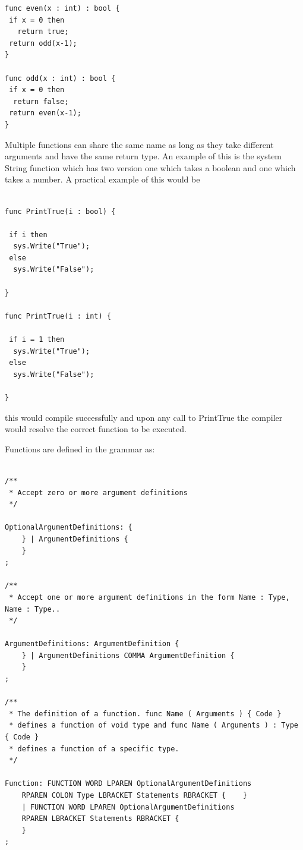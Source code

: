 \documentclass[]{final_report}
\begin{document}
\begin{verbatim}
func even(x : int) : bool {
 if x = 0 then 
   return true;
 return odd(x-1);
}

func odd(x : int) : bool {
 if x = 0 then 
  return false;
 return even(x-1);
}
\end{verbatim}

Multiple functions can share the same name as long as they take different arguments and have the same return type. An example of this is the system String function which has two version one which takes a boolean and one which takes a number. A practical example of this would be

\begin{verbatim}

func PrintTrue(i : bool) {

 if i then 
  sys.Write("True"); 
 else 
  sys.Write("False");

}

func PrintTrue(i : int) {

 if i = 1 then
  sys.Write("True");
 else
  sys.Write("False");

}

\end{verbatim}

this would compile successfully and upon any call to PrintTrue the compiler would resolve the correct function to be executed.

Functions are defined in the grammar as:

\begin{verbatim}

/**
 * Accept zero or more argument definitions
 */

OptionalArgumentDefinitions: {
	} | ArgumentDefinitions {
	}
;

/**
 * Accept one or more argument definitions in the form Name : Type, Name : Type..
 */

ArgumentDefinitions: ArgumentDefinition {
	} | ArgumentDefinitions COMMA ArgumentDefinition {
	}
;

/**
 * The definition of a function. func Name ( Arguments ) { Code } 
 * defines a function of void type and func Name ( Arguments ) : Type { Code }
 * defines a function of a specific type.
 */

Function: FUNCTION WORD LPAREN OptionalArgumentDefinitions 
	RPAREN COLON Type LBRACKET Statements RBRACKET { 	} 
	| FUNCTION WORD LPAREN OptionalArgumentDefinitions 
	RPAREN LBRACKET Statements RBRACKET {
	}
;
\end{verbatim}
\end{document}
